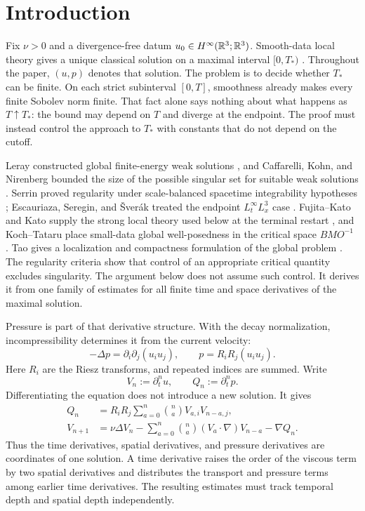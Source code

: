 \section{Introduction}
\label{sec:introduction}

Fix \(\nu>0\) and a divergence-free datum
\(u_0\in H^\infty(\mathbb R^3;\mathbb R^3)\).  Smooth-data local theory gives a unique
classical solution on a maximal interval \([0,T_*)\)
\cite{FujitaKato1964,Kato1984}.  Throughout the paper, \((u,p)\) denotes that
solution.  The problem is to decide whether \(T_*\) can be finite.  On each strict
subinterval \([0,T]\), smoothness already makes every finite Sobolev norm
finite.  That fact alone says nothing about what happens as \(T\uparrow T_*\):
the bound may depend on \(T\) and diverge at the endpoint.  The proof must
instead control the approach to \(T_*\) with constants that do not depend on
the cutoff.

Leray constructed global finite-energy weak solutions \cite{Leray1934}, and
Caffarelli, Kohn, and Nirenberg bounded the size of the possible singular set
for suitable weak solutions \cite{CKN1982}.  Serrin proved regularity under
scale-balanced spacetime integrability hypotheses \cite{Serrin1962};
Escauriaza, Seregin, and \v{S}ver\'ak treated the endpoint
\(L^\infty_tL^3_x\) case \cite{ESS2003}.  Fujita--Kato and Kato supply the
strong local theory used below at the terminal restart
\cite{FujitaKato1964,Kato1984}, and Koch--Tataru place small-data
global well-posedness in the critical space \(BMO^{-1}\)
\cite{KochTataru2001}.
Tao gives a localization and compactness formulation of the global problem
\cite{Tao2013}.  The regularity criteria show that control of an appropriate
critical quantity excludes singularity.  The argument below does not assume
such control.  It derives it from one family of estimates for all finite time
and space derivatives of the maximal solution.

Pressure is part of that derivative structure.  With the decay normalization,
incompressibility determines it from the current velocity:
\[
 -\Delta p=\partial_i\partial_j(u_i u_j),
 \qquad
 p=R_iR_j(u_i u_j).
\]
Here \(R_i\) are the Riesz transforms, and repeated indices are summed.
Write
\[
 V_n:=\partial_t^nu,
 \qquad
 Q_n:=\partial_t^np.
\]
Differentiating the equation does not introduce a new solution.  It gives
\begin{align}
 Q_n
 &=R_iR_j\sum_{a=0}^{n}\binom naV_{a,i}V_{n-a,j},
 \label{eq:intro-pressure-recurrence}\\
 V_{n+1}
 &=\nu\Delta V_n
 -\sum_{a=0}^{n}\binom na(V_a\cdot\nabla)V_{n-a}
 -\nabla Q_n.
 \label{eq:intro-velocity-recurrence}
\end{align}
Thus the time derivatives, spatial derivatives, and pressure derivatives are
coordinates of one solution.  A time derivative raises the order of the
viscous term by two spatial derivatives and distributes the transport and
pressure terms among earlier time derivatives.  The resulting estimates must
track temporal depth and spatial depth independently.

